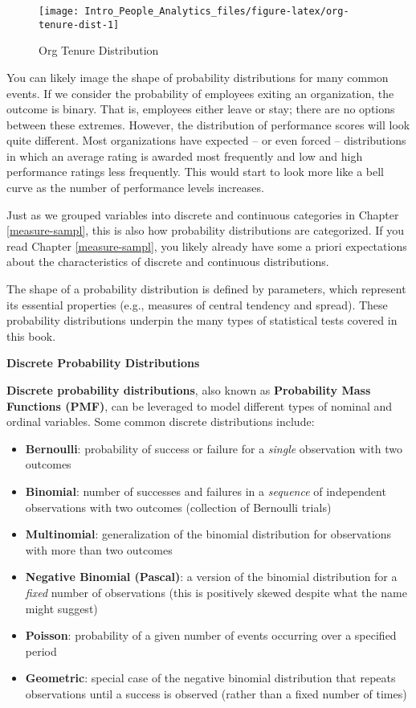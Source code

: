 \documentclass[
]{book}
\providecommand{\tightlist}{%
  \setlength{\itemsep}{0pt}\setlength{\parskip}{0pt}}
\begin{document}
\begin{figure}

{\centering \texttt{[image: Intro\_People\_Analytics\_files/figure-latex/org-tenure-dist-1]} 

}

\caption{Org Tenure Distribution}\label{fig:org-tenure-dist}
\end{figure}

You can likely image the shape of probability distributions for many common events. If we consider the probability of employees exiting an organization, the outcome is binary. That is, employees either leave or stay; there are no options between these extremes. However, the distribution of performance scores will look quite different. Most organizations have expected -- or even forced -- distributions in which an average rating is awarded most frequently and low and high performance ratings less frequently. This would start to look more like a bell curve as the number of performance levels increases.

Just as we grouped variables into discrete and continuous categories in Chapter \ref{measure-sampl}, this is also how probability distributions are categorized. If you read Chapter \ref{measure-sampl}, you likely already have some a priori expectations about the characteristics of discrete and continuous distributions.

The shape of a probability distribution is defined by parameters, which represent its essential properties (e.g., measures of central tendency and spread). These probability distributions underpin the many types of statistical tests covered in this book.

\textbf{Discrete Probability Distributions}

\textbf{Discrete probability distributions}, also known as \textbf{Probability Mass Functions (PMF)}, can be leveraged to model different types of nominal and ordinal variables. Some common discrete distributions include:

\begin{itemize}
\tightlist
\item
  \textbf{Bernoulli}: probability of success or failure for a \emph{single} observation with two outcomes
\item
  \textbf{Binomial}: number of successes and failures in a \emph{sequence} of independent observations with two outcomes (collection of Bernoulli trials)
\item
  \textbf{Multinomial}: generalization of the binomial distribution for observations with more than two outcomes
\item
  \textbf{Negative Binomial (Pascal)}: a version of the binomial distribution for a \emph{fixed} number of observations (this is positively skewed despite what the name might suggest)
\item
  \textbf{Poisson}: probability of a given number of events occurring over a specified period
\item
  \textbf{Geometric}: special case of the negative binomial distribution that repeats observations until a success is observed (rather than a fixed number of times)
\end{itemize}
\end{document}

